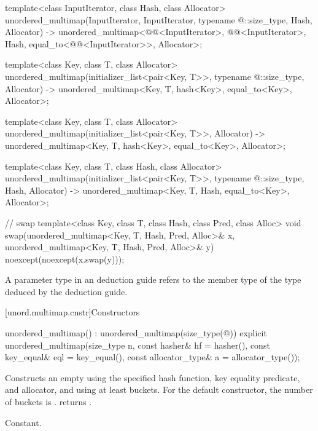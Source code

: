 \begin{codeblock}
{  template<class InputIterator, class Hash, class Allocator>
    unordered_multimap(InputIterator, InputIterator, typename @\seebelow@::size_type, Hash,
                       Allocator)
      -> unordered_multimap<@@<InputIterator>, @@<InputIterator>, Hash,
                            equal_to<@@<InputIterator>>, Allocator>;

  template<class Key, class T, class Allocator>
    unordered_multimap(initializer_list<pair<Key, T>>, typename @\seebelow@::size_type,
                       Allocator)
      -> unordered_multimap<Key, T, hash<Key>, equal_to<Key>, Allocator>;

  template<class Key, class T, class Allocator>
    unordered_multimap(initializer_list<pair<Key, T>>, Allocator)
      -> unordered_multimap<Key, T, hash<Key>, equal_to<Key>, Allocator>;

  template<class Key, class T, class Hash, class Allocator>
    unordered_multimap(initializer_list<pair<Key, T>>, typename @\seebelow@::size_type,
                       Hash, Allocator)
      -> unordered_multimap<Key, T, Hash, equal_to<Key>, Allocator>;

  // swap
  template<class Key, class T, class Hash, class Pred, class Alloc>
    void swap(unordered_multimap<Key, T, Hash, Pred, Alloc>& x,
              unordered_multimap<Key, T, Hash, Pred, Alloc>& y)
      noexcept(noexcept(x.swap(y)));
}
\end{codeblock}

\pnum
A  parameter type in an  deduction guide
refers to the  member type of the type deduced by the deduction guide.

[unord.multimap.cnstr]{Constructors}

%
\begin{itemdecl}
unordered_multimap() : unordered_multimap(size_type(@\seebelow@)) { }
explicit unordered_multimap(size_type n,
                            const hasher& hf = hasher(),
                            const key_equal& eql = key_equal(),
                            const allocator_type& a = allocator_type());
\end{itemdecl}

\begin{itemdescr}
\pnum
\effects
Constructs an empty  using the
specified hash function, key equality predicate, and allocator, and
using at least  buckets.  For the default constructor,
the number of buckets is .
 returns .

\pnum
\complexity
Constant.
\end{itemdescr}


